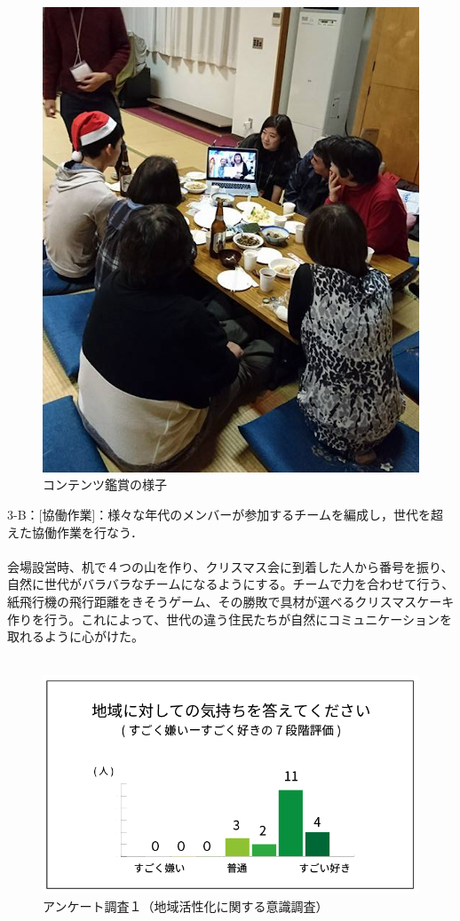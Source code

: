 \documentclass[a4paper]{jsarticle}
\begin{document}
\begin{figure}[H]
  \begin{center}
    \includegraphics[width=0.95\hsize]{./images/09}
    \caption{コンテンツ鑑賞の様子}
    \label{fig:tmu_hino}
  \end{center}
\end{figure}
3-B：[協働作業]：様々な年代のメンバーが参加するチームを編成し，世代を超えた協働作業を行なう．\\\\
会場設営時、机で４つの山を作り、クリスマス会に到着した人から番号を振り、自然に世代がバラバラなチームになるようにする。チームで力を合わせて行う、紙飛行機の飛行距離をきそうゲーム、その勝敗で具材が選べるクリスマスケーキ作りを行う。これによって、世代の違う住民たちが自然にコミュニケーションを取れるように心がけた。\\\\
\begin{figure}[H]
  \begin{center}
    \includegraphics[width=0.95\hsize]{./images/03}
    \caption{アンケート調査１（地域活性化に関する意識調査）}
    \label{fig:tmu_hino}
  \end{center}
\end{figure}
\end{document}
